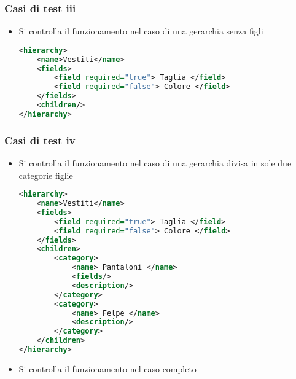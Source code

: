 \begin{frame}[fragile]
    \frametitle{Casi di test iii}
    \lstset{style=java}
    \begin{itemize}
        \item <1-> Si controlla il funzionamento nel caso di una gerarchia senza figli
\begin{lstlisting}[language=xml]
<hierarchy>
    <name>Vestiti</name>
    <fields>
        <field required="true"> Taglia </field>
        <field required="false"> Colore </field>
    </fields>
    <children/>
</hierarchy>
\end{lstlisting}
    \end{itemize}
\end{frame}
\note{
    
}

\disablefooter
\begin{frame}[fragile]
    \frametitle{Casi di test iv}
    \lstset{style=tiny_java}
    \begin{itemize}
        \item <1-> Si controlla il funzionamento nel caso di una gerarchia divisa in sole due categorie figlie
\begin{lstlisting}[language=xml]
<hierarchy>
    <name>Vestiti</name>
    <fields>
        <field required="true"> Taglia </field>
        <field required="false"> Colore </field>
    </fields>
    <children>
        <category>
            <name> Pantaloni </name>
            <fields/>
            <description/>
        </category>
        <category>
            <name> Felpe </name>
            <description/>
        </category>
    </children>
</hierarchy>
\end{lstlisting}
        \item <2-> Si controlla il funzionamento nel caso completo
    \end{itemize}
\end{frame}
\enablefooter

